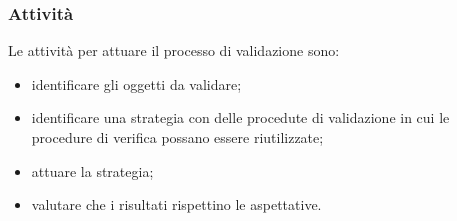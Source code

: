         \subsubsection{Attività}
        Le attività per attuare il processo di validazione sono:
        \begin{itemize}
            \item identificare gli oggetti da validare;
            \item identificare una strategia con delle procedute di validazione in cui le procedure di verifica possano essere riutilizzate;
            \item attuare la strategia;
            \item valutare che i risultati rispettino le aspettative.
        \end{itemize}